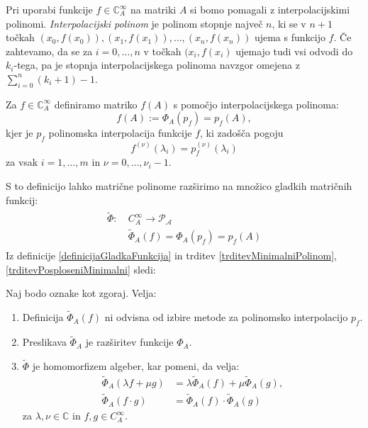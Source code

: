 \documentclass[mat1]{fmfdelo}
\newcommand{\C}{\mathbb C}
\begin{document}
Pri uporabi funkcije $f \in \C_A^\infty$ na matriki $A$ si bomo pomagali z interpolacijskimi polinomi. \emph{Interpolacijski polinom} je polinom stopnje največ $n$, ki se v $n+1$ točkah $(x_0, f(x_0)), (x_1, f(x_1)), \ldots, (x_n, f(x_n))$ ujema s funkcijo $f$. Če zahtevamo, da se za $i=0, \ldots, n$ v točkah $(x_i, f(x_i)$ ujemajo tudi vsi odvodi do $k_i$-tega, pa je stopnja interpolacijskega polinoma navzgor omejena z $\sum_{i=0}^n (k_i + 1) - 1$.
\begin{definicija} \label{definicijaGladkaFunkcija}
    Za $f \in \C_A^\infty$ definiramo matriko $f(A)$ s pomočjo interpolacijskega polinoma:
    \begin{equation*}
        f(A) := \Phi_A(p_f) = p_f(A),
    \end{equation*}
    kjer je $p_f$ polinomska interpolacija funkcije $f$, ki zadošča pogoju
    \begin{equation*}
        f^{(\nu)}(\lambda_i) = p_f^{(\nu)}(\lambda_i)
    \end{equation*}
    za vsak $i = 1, \ldots, m$ in $\nu = 0, \ldots, \nu_i-1$.
\end{definicija}
S to definicijo lahko matrične polinome razširimo na množico gladkih matričnih funkcij:
\begin{align}
    \begin{split}
        \widetilde{\Phi} :\ &C_A^\infty \longrightarrow \mathcal{P_A} \\
        &\widetilde{\Phi}_A(f) = \Phi_A(p_f) = p_f(A)
    \end{split}
\end{align}
Iz definicije \ref{definicijaGladkaFunkcija} in trditev \ref{trditevMinimalniPolinom}, \ref{trditevPosploseniMinimalni} sledi:
\begin{trditev} \label{trditevPhiAlgebra}
    Naj bodo oznake kot zgoraj. Velja:
    \begin{enumerate}
        \item Definicija $\widetilde{\Phi}_A(f)$ ni odvisna od izbire metode za polinomsko interpolacijo $p_f$.
        \item Preslikava $\widetilde{\Phi}_A$ je razširitev funkcije $\Phi_A$.
        \item $\widetilde{\Phi}$ je homomorfizem algeber, kar pomeni, da velja:
        \begin{align*}
            \widetilde{\Phi}_A(\lambda f + \mu g) &= \lambda \widetilde{\Phi}_A(f) + \mu \widetilde{\Phi}_A(g), \\
            \widetilde{\Phi}_A(f \cdot g) &= \widetilde{\Phi}_A(f) \cdot \widetilde{\Phi}_A(g)
        \end{align*}
        za $\lambda, \nu \in \C$ in $f, g \in C_A^\infty$.
    \end{enumerate}
\end{trditev}
\end{document}
